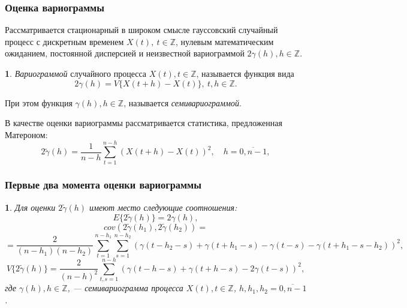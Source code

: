 \documentclass[notheorems]{beamer}
\newtheorem{theorem}{\translate{Theorem}}[section]
\newtheorem{theorem}{\translate{Theorem}}
\theoremstyle{definition}
\newtheorem{definition}{\translate{Definition}}
\theoremstyle{example}
\theoremstyle{plain}
\newenvironment{Theorem}{\begin{theorem}}{\end{theorem}}
\newenvironment{Definition}{\begin{definition}}{\end{definition}}
\begin{document}
\begin{frame}
  \frametitle{Оценка вариограммы}
  Рассматривается стационарный в широком смысле гауссовский случайный процесс с дискретным временем $ X(t),~ t \in \mathbb{Z} $, нулевым математическим ожиданием, постоянной дисперсией и неизвестной вариограммой $ 2 \gamma(h), h \in \mathbb{Z} $.
  \begin{Definition}
    \textit{Вариограммой} случайного процесса $ X(t), t \in \mathbb{Z} $, называется функция вида
    \begin{equation}
    \label{eq:matheron}
        2 \gamma (h) = V \{ X(t + h) - X(t) \},~ t, h \in \mathbb{Z}.
    \end{equation}

    При этом функция $ \gamma (h), h \in \mathbb{Z} $, называется \textit{семивариограммой}.
  \end{Definition}
  В качестве оценки вариограммы рассматривается статистика, предложенная Матероном:
  \begin{equation}
    2 \tilde{\gamma}(h) = \frac{1}{n - h} \sum_{t = 1}^{n - h}(X(t + h) - X(t))^2, \quad h = \overline{0, n - 1},
  \end{equation}
\end{frame}

\begin{frame}
  \frametitle{Первые два момента оценки вариограммы}
\begin{Theorem}
  Для оценки $ 2 \tilde{\gamma}(h) $ имеют место следующие соотношения:
  \begin{equation*}
    E \{2 \tilde{\gamma}(h) \} = 2 \gamma(h), %
  \end{equation*}
  \begin{equation*}
    cov(2 \tilde{\gamma}(h_1), 2 \tilde{\gamma}(h_2)) =
  \end{equation*}
  \begin{equation*}
    = \frac{2}{(n - h_1)(n - h_2)} \sum_{t = 1}^{n - h_1}\sum_{s = 1}^{n - h_2} (\gamma(t - h_2 - s) + \gamma(t + h_1 - s) - \gamma(t - s) - \gamma(t + h_1 - s - h_2))^2,
  \end{equation*}
  \begin{equation*}
    V \{ 2 \tilde{\gamma}(h) \} = \frac{2}{(n-h)^2}\sum_{t,s = 1}^{n - h} ( \gamma(t - h - s) + \gamma(t + h - s) - 2\gamma(t - s) )^2,
  \end{equation*}
  где $ \gamma(h), h \in \mathbb{Z} $, --- семивариограмма процесса $ X(t), t \in \mathbb{Z}$, $ h, h_1, h_2 = \overline{0, n - 1} $.
\end{Theorem}
\end{frame}
\end{document}
